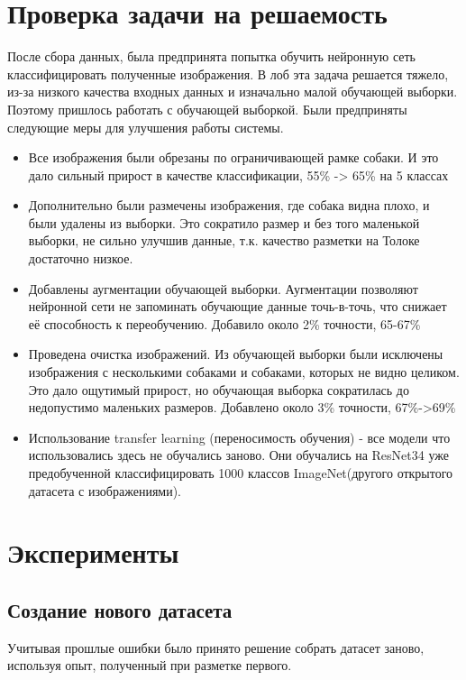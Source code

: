 \section{Проверка задачи на решаемость} \label{sect3_2}
После сбора данных, была предпринята попытка обучить нейронную сеть классифицировать полученные изображения. В лоб эта задача решается тяжело, из-за низкого качества входных данных и изначально малой обучающей выборки. Поэтому пришлось работать с обучающей выборкой. Были предприняты следующие меры для улучшения работы системы.
\begin{itemize}
    \item Все изображения были обрезаны по ограничивающей рамке собаки. И это дало сильный прирост в качестве классификации, 55\% -> 65\% на 5 классах
    \item Дополнительно были размечены изображения, где собака видна плохо, и были удалены из выборки. Это сократило размер и без того маленькой выборки, не сильно улучшив данные, т.к. качество разметки на Толоке достаточно низкое.
    \item Добавлены аугментации обучающей выборки. Аугментации позволяют нейронной сети не запоминать обучающие данные точь-в-точь, что снижает её способность к переобучению. Добавило около 2\% точности, 65-67\%
    \item Проведена очистка изображений. Из обучающей выборки были исключены изображения с несколькими собаками и собаками, которых не видно целиком. Это дало ощутимый прирост, но обучающая выборка сократилась до недопустимо маленьких размеров. Добавлено около 3\% точности, 67\%->69\%
    \item Использование transfer learning (переносимость обучения) - все модели что использовались здесь не обучались заново. Они обучались на ResNet34 уже предобученной классифицировать 1000 классов ImageNet(другого открытого датасета с изображениями).

\end{itemize}
\section{Эксперименты} \label{sect3_3}

\subsection{Создание нового датасета} \label{subsect3_3_1}
Учитывая прошлые ошибки было принято решение собрать датасет заново, используя опыт, полученный при разметке первого.

